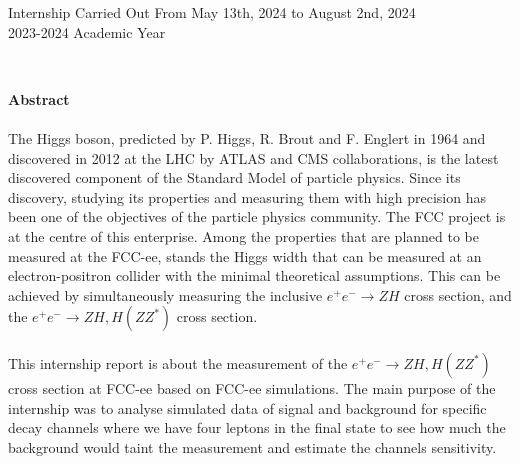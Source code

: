\documentclass[a4paper,11pt]{article}
\begin{document}
\begin{titlepage}
		\vspace{3cm}
	
		\begin{center}
			Internship Carried Out From May 13th, 2024 to August 2nd, 2024\\
			2023-2024 Academic Year
		\end{center}
		
		\newpage %
		\thispagestyle{empty} %
	\end{titlepage}

	
	
	\newpage 
	\ %
	\newpage
	

	\noindent
	{\Large\textbf{Abstract}}\\\\
	The Higgs boson, predicted by P. Higgs, R. Brout and F. Englert in 1964 and discovered in 2012 at the LHC by ATLAS and CMS collaborations, is the latest discovered component of the Standard Model of particle physics. Since its discovery, studying its properties and measuring them with high precision has been one of the objectives of the particle physics community. The FCC project is at the centre of this enterprise. Among the properties that are planned to be measured at the FCC-ee, stands the Higgs width that can be measured at an electron-positron collider with the minimal theoretical assumptions. This can be achieved by simultaneously measuring the inclusive $e^+e^-\rightarrow ZH$ cross section, and the $e^+e^-\rightarrow ZH,H(ZZ^*)$ cross section.\\\\
	This internship report is about the measurement of the $e^+e^-\rightarrow ZH,H(ZZ^*)$ cross section at FCC-ee based on FCC-ee simulations. The main purpose of the internship was to analyse simulated data of signal and background for specific decay channels where we have four leptons in the final state to see how much the background would taint the measurement and estimate the channels sensitivity.\\\\
    \\\\\\\\\\\\
	
\end{document}
